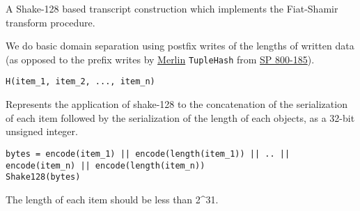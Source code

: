 \documentclass[
]{article}
\begin{document}
A Shake-128 based transcript construction which implements the
Fiat-Shamir transform procedure.

We do basic domain separation using postfix writes of the lengths of
written data (as opposed to the prefix writes by
\href{https://merlin.cool}{Merlin} \texttt{TupleHash} from
\href{https://csrc.nist.gov/pubs/sp/800/185/final}{SP 800-185}).

\begin{verbatim}
H(item_1, item_2, ..., item_n)
\end{verbatim}

Represents the application of shake-128 to the concatenation of the
serialization of each item followed by the serialization of the length
of each objects, as a 32-bit unsigned integer.

\begin{verbatim}
bytes = encode(item_1) || encode(length(item_1)) || .. || encode(item_n) || encode(length(item_n))
Shake128(bytes)
\end{verbatim}

The length of each item should be less than 2\^{}31.
\end{document}

